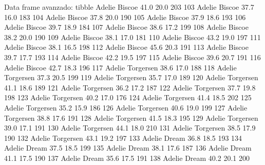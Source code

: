 \documentclass[
  ignorenonframetext,
  aspectratio=169]{beamer}
\let\oldverbatim\verbatim
\let\endoldverbatim\endverbatim
\renewenvironment{verbatim}{\tiny\oldverbatim}{\endoldverbatim}
\begin{document}
\begin{frame}[fragile]{Data frame avanzado: tibble}
\begin{verbatim}
102    Adelie    Biscoe           41.0          20.0               203
103    Adelie    Biscoe           37.7          16.0               183
104    Adelie    Biscoe           37.8          20.0               190
105    Adelie    Biscoe           37.9          18.6               193
106    Adelie    Biscoe           39.7          18.9               184
107    Adelie    Biscoe           38.6          17.2               199
108    Adelie    Biscoe           38.2          20.0               190
109    Adelie    Biscoe           38.1          17.0               181
110    Adelie    Biscoe           43.2          19.0               197
111    Adelie    Biscoe           38.1          16.5               198
112    Adelie    Biscoe           45.6          20.3               191
113    Adelie    Biscoe           39.7          17.7               193
114    Adelie    Biscoe           42.2          19.5               197
115    Adelie    Biscoe           39.6          20.7               191
116    Adelie    Biscoe           42.7          18.3               196
117    Adelie Torgersen           38.6          17.0               188
118    Adelie Torgersen           37.3          20.5               199
119    Adelie Torgersen           35.7          17.0               189
120    Adelie Torgersen           41.1          18.6               189
121    Adelie Torgersen           36.2          17.2               187
122    Adelie Torgersen           37.7          19.8               198
123    Adelie Torgersen           40.2          17.0               176
124    Adelie Torgersen           41.4          18.5               202
125    Adelie Torgersen           35.2          15.9               186
126    Adelie Torgersen           40.6          19.0               199
127    Adelie Torgersen           38.8          17.6               191
128    Adelie Torgersen           41.5          18.3               195
129    Adelie Torgersen           39.0          17.1               191
130    Adelie Torgersen           44.1          18.0               210
131    Adelie Torgersen           38.5          17.9               190
132    Adelie Torgersen           43.1          19.2               197
133    Adelie     Dream           36.8          18.5               193
134    Adelie     Dream           37.5          18.5               199
135    Adelie     Dream           38.1          17.6               187
136    Adelie     Dream           41.1          17.5               190
137    Adelie     Dream           35.6          17.5               191
138    Adelie     Dream           40.2          20.1               200

\end{verbatim}
\end{frame}
\end{document}

